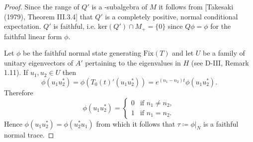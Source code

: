 \begin{proof}
Since the range of $Q'$ is a \WA-subalgebra of $M$ it follows from [Takesaki (1979), Theorem III.3.4] that $Q'$ is a completely positive, normal conditional expectation.
$Q'$ is faithful, i.e. $\text{ker}(Q') \cap M_{+} = \{0\}$ since $Q\phi = \phi$ for the faithful linear form $\phi$.

\newpage

Let $\phi$ be the faithful normal state generating $\text{Fix}(T)$ and let $U$ be a family of unitary eigenvectors of $A'$ pertaining to the eigenvalues in $H$ (see D-III, Remark 1.11).
If $u_{1}, u_{2} \in U$ then
\[
\phi(u_{1}u_{2}^{*}) = \phi(T_{0}(t)'(u_{1}u_{2}^{*})) = e^{(n_{1}-n_{2})t}\phi(u_{1}u_{2}^{*}).
\]
Therefore
\[
\phi(u_{1}u_{2}^{*}) = \begin{cases} 0 & \text{if } n_{1} \neq n_{2}, \\ 1 & \text{if } n_{1} = n_{2}. \end{cases}
\]
Hence $\phi(u_{1}u_{2}^{*}) = \phi(u_{2}^{*}u_{1})$ from which it follows that $\tau \coloneqq \phi|_{N}$ is a faithful normal trace.
\end{proof}

